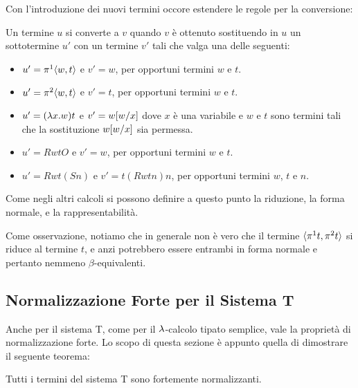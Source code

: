 \documentclass[]{marticle}
\begin{document}
Con l'introduzione dei nuovi termini occore estendere le regole per la
conversione:
\begin{block}[Definizione]
    Un termine $u$ si converte a $v$ quando $v$ \`e ottenuto sostituendo in $u$
    un sottotermine $u'$ con un termine $v'$ tali che valga una delle seguenti:
    \begin{itemize}
        \item $u'=\pi^1\langle w,t \rangle$ e $v'=w$, per opportuni termini $w$ e $t$.
        \item $u'=\pi^2\langle w,t \rangle$ e $v'=t$, per opportuni termini $w$ e $t$.
        \item $u'= (\lambda x. w)t$ e $v' = w[w/x]$ dove $x$ \`e una variabile e
            $w$ e $t$ sono termini tali che la sostituzione $w[w/x]$ sia
            permessa.
        \item $u' = RwtO$ e $v'=w$, per opportuni termini $w$ e $t$.
        \item $u' = Rwt(Sn)$ e $v' = t(Rwtn)n$, per opportuni termini $w$, $t$ e
            $n$.
    \end{itemize}
\end{block}

Come negli altri calcoli si possono definire a questo punto la riduzione, la
forma normale, e la rappresentabilit\`a.

Come osservazione, notiamo che in generale non \`e vero che il termine
$\langle \pi^1t, \pi^2t \rangle$ si riduce al termine $t$, e anzi potrebbero essere
entrambi in forma normale e pertanto nemmeno $\beta$-equivalenti. 

\subsection{Normalizzazione Forte per il Sistema T}

Anche per il sistema T, come per il $\lambda$-calcolo tipato semplice, vale la
propriet\`a di normalizzazione forte. Lo scopo di questa sezione \`e appunto
quella di dimostrare il seguente teorema:
\begin{block}[Teorema]
    Tutti i termini del sistema T sono fortemente normalizzanti.
\end{block}
\end{document}
